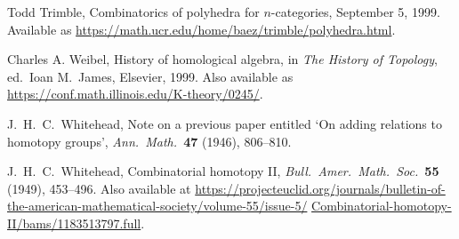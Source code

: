 \documentclass[reqno,12pt]{amsart}
\theoremstyle{definition}
\begin{document}
\begin{thebibliography}{99}
Todd Trimble, Combinatorics of polyhedra for $n$-categories, September 5, 1999.  Available as
\href{https://math.ucr.edu/home/baez/trimble/polyhedra.html}{https://math.ucr.edu/home/baez/trimble/polyhedra.html}.

Charles A. Weibel, History of homological algebra, in \textsl{The History of Topology}, ed.\ Ioan M.\ James, Elsevier, 1999.   Also available as \href{https://conf.math.illinois.edu/K-theory/0245/}{https://conf.math.illinois.edu/K-theory/0245/}.

J.\ H.\ C.\ Whitehead, Note on a previous paper entitled `On adding relations to homotopy groups', {\sl Ann.\ Math.\ }\textbf{47} (1946), 806--810.

J.\ H.\ C.\ Whitehead, Combinatorial homotopy II, {\sl Bull.\ Amer.\
Math.\ Soc.\ }\textbf{55} (1949), 453--496.  Also available at 
\href{https://projecteuclid.org/journals/bulletin-of-the-american-mathematical-society/volume-55/issue-5/Combinatorial-homotopy-II/bams/1183513797.full}{https://projecteuclid.org/journals/bulletin-of-the-american-mathematical-society/volume-55/issue-5/} \hfill \break \href{https://projecteuclid.org/journals/bulletin-of-the-american-mathematical-society/volume-55/issue-5/Combinatorial-homotopy-II/bams/1183513797.full}{Combinatorial-homotopy-II/bams/1183513797.full}.

\end{thebibliography}
\end{document}
